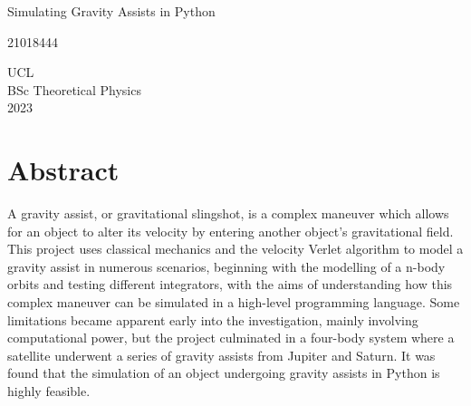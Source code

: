 \documentclass[11pt, english]{report}
\begin{document}
\begin{titlepage}

   \begin{center}
       \vspace*{3cm}
       {Simulating Gravity Assists in Python}
 
       \vspace{4cm}
 
       {21018444}\\
       
       \vspace*{10cm}
      
       
      UCL\\
      
      BSc Theoretical Physics\\
      
      2023
      
 
   \end{center}
\end{titlepage}

\setcounter{page}{2}
\noindent 
\chapter*{\huge{\textbf{Abstract}}}
\normalsize{\noindent A gravity assist, or gravitational slingshot, is a complex maneuver which allows for an object to alter its velocity by entering another object's gravitational field. This project uses classical mechanics and the velocity Verlet algorithm to model a gravity assist in numerous scenarios, beginning with the modelling of a n-body orbits and testing different integrators, with the aims of understanding how this complex maneuver can be simulated in a high-level programming language. Some limitations became apparent early into the investigation, mainly involving computational power, but the project culminated in a four-body system where a satellite underwent a series of gravity assists from Jupiter and Saturn. It was found that the simulation of an object undergoing gravity assists in Python is highly feasible.}
%


%


\setlength{\cftbeforetoctitleskip}{-22pt}
\setlength{\cftaftertoctitleskip}{-22pt}
\renewcommand{\contentsname}{\huge\textbf{Table of Contents}}
\renewcommand{\cfttoctitlefont}{\chapter*}
\end{document}
